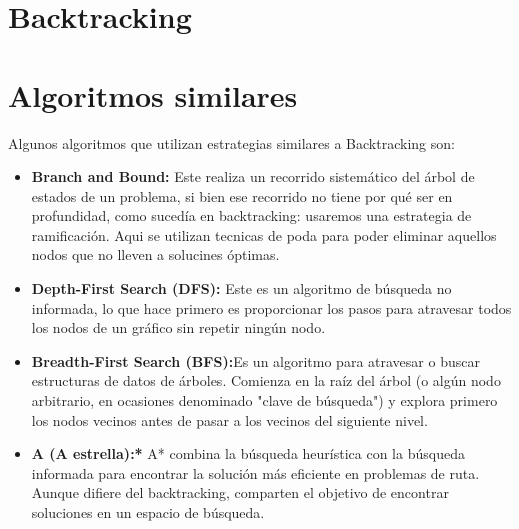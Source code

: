 \documentclass[a4paper,12pt]{article}
\begin{document}


\newpage
\section{Backtracking}





\section{Algoritmos similares}
Algunos algoritmos que utilizan estrategias similares a Backtracking son:

\begin{itemize}
    \item \textbf{Branch and Bound:} Este realiza un recorrido sistemático del árbol de estados de un problema, si bien ese recorrido no tiene por qué ser en profundidad, como sucedía en backtracking: usaremos una estrategia de ramificación. Aqui se utilizan tecnicas de poda para poder eliminar aquellos nodos que no lleven a solucines óptimas.
    
    \item \textbf{Depth-First Search (DFS):} Este es un algoritmo de búsqueda no informada, lo que hace primero es proporcionar los pasos para atravesar todos los nodos de un gráfico sin repetir ningún nodo.
    
    \item \textbf{Breadth-First Search (BFS):}Es un algoritmo para atravesar o buscar estructuras de datos de árboles. Comienza en la raíz del árbol (o algún nodo arbitrario, en ocasiones denominado "clave de búsqueda") y explora primero los nodos vecinos antes de pasar a los vecinos del siguiente nivel.
    
    \item \textbf{A (A estrella):*} A* combina la búsqueda heurística con la búsqueda informada para encontrar la solución más eficiente en problemas de ruta. Aunque difiere del backtracking, comparten el objetivo de encontrar soluciones en un espacio de búsqueda.
\end{itemize}
\end{document}
